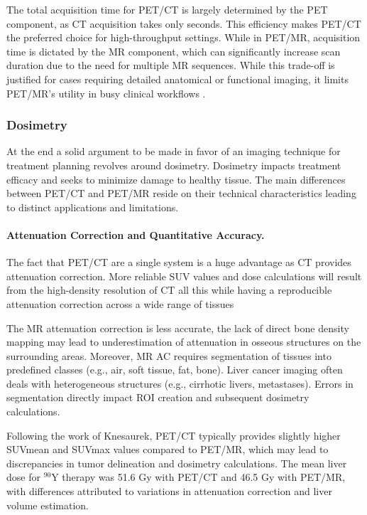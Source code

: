 \documentclass[11pt]{article} %
\begin{document}
\begin{multicols}{2}
The total acquisition time for PET/CT is largely determined by the PET component, as CT acquisition takes only seconds. This efficiency makes PET/CT the preferred choice for high-throughput settings\cite{knesaurek2018}.
While in PET/MR, acquisition time is dictated by the MR component, which can significantly increase scan duration due to the need for multiple MR sequences. %
While this trade-off is justified for cases requiring detailed anatomical or functional imaging, it limits PET/MR’s utility in busy clinical workflows \cite{knesaurek2018}.


\subsubsection{Dosimetry}
At the end a solid argument to be made in favor of an imaging technique for treatment planning revolves around dosimetry. Dosimetry impacts treatment efficacy and seeks to minimize damage to healthy tissue. The main differences between PET/CT and PET/MR reside on their technical characteristics leading to distinct applications and limitations.

\paragraph{Attenuation Correction and Quantitative Accuracy.}

The fact that PET/CT are a single system is a huge advantage as CT provides attenuation correction. More reliable SUV values and dose calculations will result from the high-density resolution of CT all this while having a reproducible attenuation correction across a wide range of tissues

The MR attenuation correction is less accurate, the lack of direct bone density mapping may lead to underestimation of attenuation in osseous structures on the surrounding areas. Moreover, MR AC requires segmentation of tissues into predefined classes (e.g., air, soft tissue, fat, bone). Liver cancer imaging often deals with heterogeneous structures (e.g., cirrhotic livers, metastases). Errors in segmentation directly impact ROI creation and subsequent dosimetry calculations. 


Following the work of Knesaurek, \cite{knesaurek2018} PET/CT typically provides slightly higher SUVmean and SUVmax values compared to PET/MR, which may lead to discrepancies in tumor delineation and dosimetry calculations. The mean liver dose for $^{90}\text{Y}$ therapy was 51.6 Gy with PET/CT and 46.5 Gy with PET/MR, with differences attributed to variations in attenuation correction and liver volume estimation.


\end{multicols}
\end{document}
